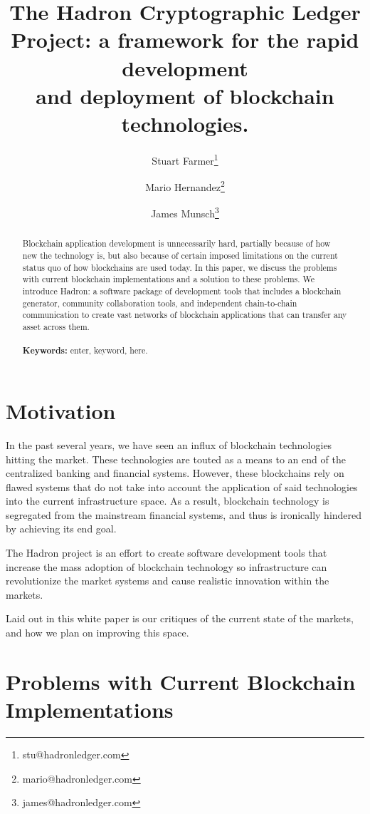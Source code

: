 \documentclass{%
	article}
\title{The Hadron Cryptographic Ledger Project: a framework for the rapid development\\and deployment of blockchain technologies.}
\author{Stuart Farmer\thanks{stu@hadronledger.com}}
\author{Mario Hernandez\thanks{mario@hadronledger.com}}
\author{James Munsch\thanks{james@hadronledger.com}}
\affil{The Hadron Project, White Paper version 0.1}
\begin{document}
\sloppy

\begin{titlingpage}
    \maketitle
    \begin{abstract}
	Blockchain application development is unnecessarily hard, partially because of how new the technology is, but also because of certain imposed limitations on the current status quo of how blockchains are used today. In this paper, we discuss the problems with current blockchain implementations and a solution to these problems. We introduce Hadron: a software package of development tools that includes a blockchain generator, community collaboration tools, and independent chain-to-chain communication to create vast networks of blockchain applications that can transfer any asset across them.\\\\
	{\bf Keywords:} enter, keyword, here.
    \end{abstract}
\end{titlingpage}

\section{Motivation}

In the past several years, we have seen an influx of blockchain technologies hitting the market. These technologies are touted as a means to an end of the centralized banking and financial systems. However, these blockchains rely on flawed systems that do not take into account the application of said technologies into the current infrastructure space. As a result, blockchain technology is segregated from the mainstream financial systems, and thus is ironically hindered by achieving its end goal.

The Hadron project is an effort to create software development tools that increase the mass adoption of blockchain technology so infrastructure can revolutionize the market systems and cause realistic innovation within the markets.

Laid out in this white paper is our critiques of the current state of the markets, and how we plan on improving this space.

\section{Problems with Current Blockchain\\ Implementations}
\end{document}
